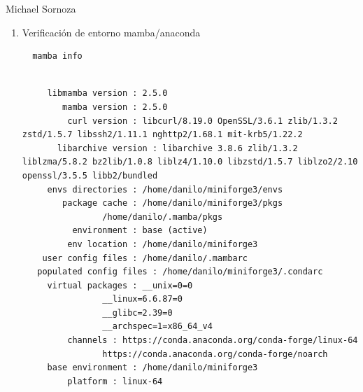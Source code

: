 \documentclass[11pt]{article}
\begin{document}
Michael Sornoza
\begin{enumerate}
\item Verificación de entorno mamba/anaconda
\begin{verbatim}
  mamba info
\end{verbatim}

\begin{verbatim}

	 libmamba version : 2.5.0
	    mamba version : 2.5.0
	     curl version : libcurl/8.19.0 OpenSSL/3.6.1 zlib/1.3.2 zstd/1.5.7 libssh2/1.11.1 nghttp2/1.68.1 mit-krb5/1.22.2
       libarchive version : libarchive 3.8.6 zlib/1.3.2 liblzma/5.8.2 bz2lib/1.0.8 liblz4/1.10.0 libzstd/1.5.7 liblzo2/2.10 openssl/3.5.5 libb2/bundled
	 envs directories : /home/danilo/miniforge3/envs
	    package cache : /home/danilo/miniforge3/pkgs
			    /home/danilo/.mamba/pkgs
	      environment : base (active)
	     env location : /home/danilo/miniforge3
	user config files : /home/danilo/.mambarc
   populated config files : /home/danilo/miniforge3/.condarc
	 virtual packages : __unix=0=0
			    __linux=6.6.87=0
			    __glibc=2.39=0
			    __archspec=1=x86_64_v4
		 channels : https://conda.anaconda.org/conda-forge/linux-64
			    https://conda.anaconda.org/conda-forge/noarch
	 base environment : /home/danilo/miniforge3
		 platform : linux-64
\end{verbatim}
\end{enumerate}
\end{document}
